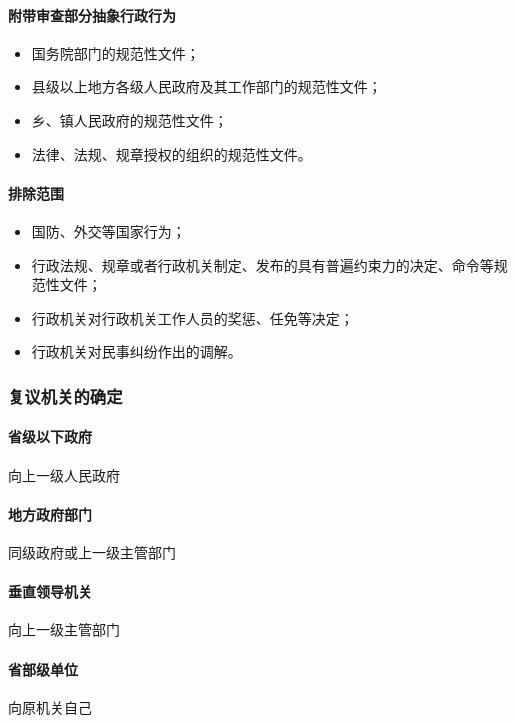 \paragraph{附带审查部分抽象行政行为}

\begin{itemize}
    \item 国务院部门的规范性文件；
    \item 县级以上地方各级人民政府及其工作部门的规范性文件；
    \item 乡、镇人民政府的规范性文件；
    \item 法律、法规、规章授权的组织的规范性文件。
\end{itemize}

\paragraph{排除范围}

\begin{itemize}
    \item 国防、外交等国家行为；
    \item 行政法规、规章或者行政机关制定、发布的具有普遍约束力的决定、命令等规范性文件；
    \item 行政机关对行政机关工作人员的奖惩、任免等决定；
    \item 行政机关对民事纠纷作出的调解。
\end{itemize}

\subsubsection{复议机关的确定} 

\paragraph{省级以下政府} 向上一级人民政府

\paragraph{地方政府部门} 同级政府或上一级主管部门

\paragraph{垂直领导机关} 向上一级主管部门

\paragraph{省部级单位} 向原机关自己

